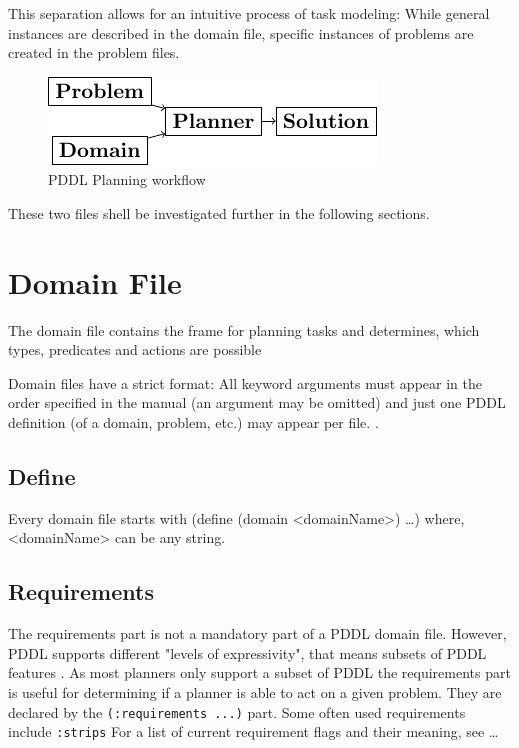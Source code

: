 \documentclass[11pt]{report}
\begin{document}
This separation allows for an intuitive process of task modeling:
While general instances are described in the domain file, specific
instances of problems are created in the problem files.

\begin{figure}[htb]
\centering
\includegraphics[width=.9\linewidth]{../img/pddl-workflow.pdf}
\caption{\label{fig:workflow}PDDL Planning workflow}
\end{figure}

These two files shell be investigated further in the following
sections.


\section{Domain File}
\label{sec-3-1}

The domain file contains the frame for planning tasks and determines,
which types, predicates and actions are possible

Domain files have a strict format: All keyword arguments must appear
in the order specified in the manual (an argument may be omitted) and
just one PDDL definition (of a domain, problem, etc.) may appear per
file. \cite[6]{fox2003pddl2}.

\begin{center}
\end{center}

\subsection{Define}
\label{sec-3-1-1}
Every domain file starts with (define (domain <domainName>) \ldots{}) where,
<domainName> can be any string.
\subsection{Requirements}
\label{sec-3-1-2}
The requirements part is not a mandatory part of a PDDL domain file.
However, PDDL supports different "levels of expressivity", that means
subsets of PDDL features \textcite[1]{mcdermott1998pddl}. As most
planners only support a subset of PDDL the requirements part is useful
for determining if a planner is able to act on a given problem. They
are declared by the \verb~(:requirements ...)~ part. Some often used
requirements include \verb~:strips~ 
For a list of current requirement flags and their meaning, see \ldots{}
\end{document}
